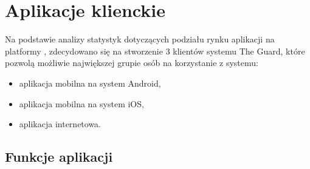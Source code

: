 \documentclass[polish,bachelor,a4paper,oneside]{ppfcmthesis}
\begin{document}
    \chapter{Aplikacje klienckie}

    Na podstawie analizy statystyk dotyczących podziału rynku aplikacji na platformy \cite{stats}, zdecydowano się na stworzenie 3 klientów systemu The Guard, które pozwolą możliwie największej grupie osób na korzystanie z systemu:
    \begin{itemize}
        \item aplikacja mobilna na system Android,
        \item aplikacja mobilna na system iOS,
        \item aplikacja internetowa.
    \end{itemize}

    \section{Funkcje aplikacji}
\end{document}

